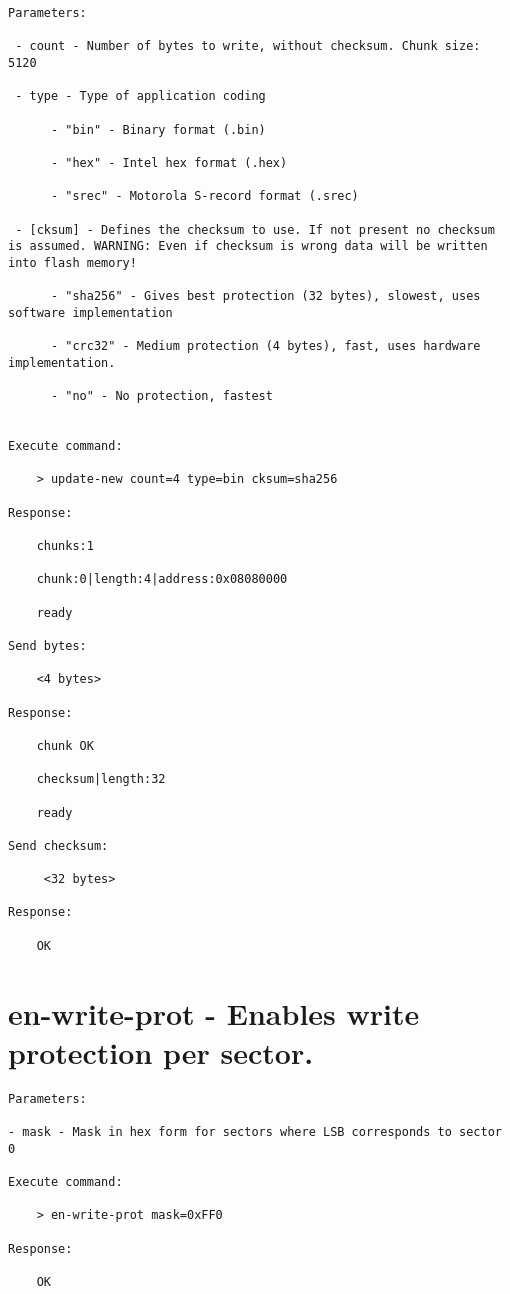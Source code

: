 \begin{lstlisting}
Parameters:

 - count - Number of bytes to write, without checksum. Chunk size: 5120
 
 - type - Type of application coding
       
      - "bin" - Binary format (.bin)
                
      - "hex" - Intel hex format (.hex)
      
      - "srec" - Motorola S-record format (.srec)
 
 - [cksum] - Defines the checksum to use. If not present no checksum is assumed. WARNING: Even if checksum is wrong data will be written into flash memory!
 
      - "sha256" - Gives best protection (32 bytes), slowest, uses software implementation
           
      - "crc32" - Medium protection (4 bytes), fast, uses hardware implementation.

      - "no" - No protection, fastest


Execute command: 

    > update-new count=4 type=bin cksum=sha256
    
Response: 

    chunks:1

    chunk:0|length:4|address:0x08080000

    ready
    
Send bytes:

    <4 bytes>
    
Response:

    chunk OK

    checksum|length:32

    ready
 
Send checksum:
     
     <32 bytes>
     
Response:
 
    OK
\end{lstlisting}

\section{en-write-prot - Enables write protection per sector.}
\label{bl_cmd:en-write-prot}

\begin{lstlisting}
Parameters:

- mask - Mask in hex form for sectors where LSB corresponds to sector 0

Execute command: 

    > en-write-prot mask=0xFF0
    
Response: 

    OK
\end{lstlisting}
    
